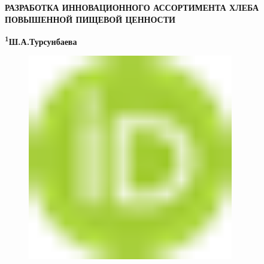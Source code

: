 
{\bfseries РАЗРАБОТКА ИННОВАЦИОННОГО АССОРТИМЕНТА ХЛЕБА ПОВЫШЕННОЙ ПИЩЕВОЙ
ЦЕННОСТИ}

{\bfseries \textsuperscript{1}Ш.А.Турсунбаева}
\begin{figure}[H]
	\centering
	\includegraphics[width=0.8\textwidth]{media/pish/image10}
	\caption*{}
\end{figure}

